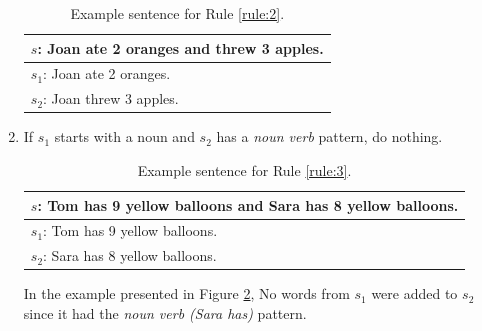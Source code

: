 \documentclass[11pt]{article}
\begin{document}
\begin{enumerate}
\begin{table}[h!]
\centering
\begin{tabular}{ | m{25em} | }
\hline
 \textbf{\begin{math}s\end{math}: Joan ate 2 oranges and threw 3 apples.}\\
\hline
\begin{math}s_{1}\end{math}: Joan ate 2 oranges.\\
\hline
\begin{math}s_{2}\end{math}: Joan threw 3 apples.\\
\hline
\end{tabular}
\caption{Example sentence for Rule \ref{rule:2}.}
\label{figure:10}
\end{table}

\item  \label{rule:3}
If \begin{math}s_{1}\end{math} starts with a noun and \begin{math}s_{2}\end{math} has a \textit{noun verb} pattern, do nothing.

\begin{table}[h!]
\centering
\begin{tabular}{ | m{25em} | }
\hline
 \textbf{\begin{math}s\end{math}: Tom has 9 yellow balloons and Sara has 8 yellow balloons.}\\
\hline
\begin{math}s_{1}\end{math}: Tom has 9 yellow balloons.\\
\hline
\begin{math}s_{2}\end{math}: Sara has 8 yellow balloons.\\
\hline
\end{tabular}
\caption{Example sentence for Rule  \ref{rule:3}.}
\label{figure:11}
\end{table}

In the example presented in Figure \ref{figure:11}, No words from \begin{math}s_{1}\end{math} were added to \begin{math}s_{2}\end{math} since it had the \textit{noun verb (Sara has)} pattern.


\end{enumerate}
\end{document}

